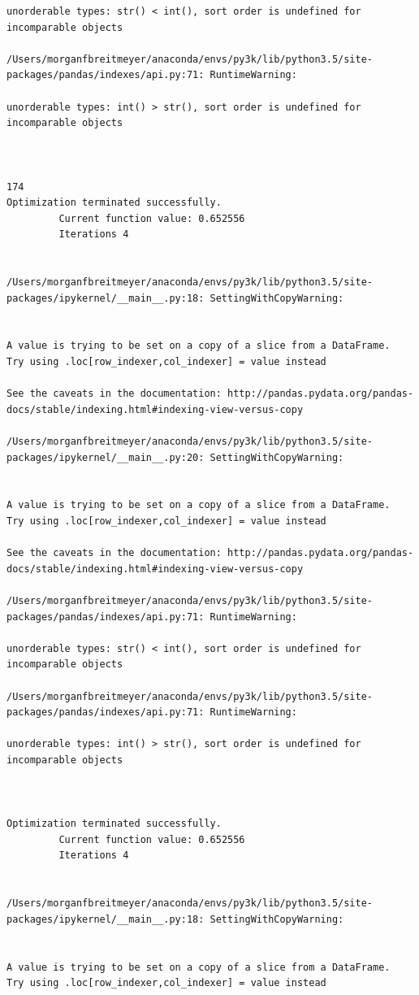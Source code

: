 \begin{lstlisting}
unorderable types: str() < int(), sort order is undefined for incomparable objects

/Users/morganfbreitmeyer/anaconda/envs/py3k/lib/python3.5/site-packages/pandas/indexes/api.py:71: RuntimeWarning:

unorderable types: int() > str(), sort order is undefined for incomparable objects



174
Optimization terminated successfully.
         Current function value: 0.652556
         Iterations 4


/Users/morganfbreitmeyer/anaconda/envs/py3k/lib/python3.5/site-packages/ipykernel/__main__.py:18: SettingWithCopyWarning:


A value is trying to be set on a copy of a slice from a DataFrame.
Try using .loc[row_indexer,col_indexer] = value instead

See the caveats in the documentation: http://pandas.pydata.org/pandas-docs/stable/indexing.html#indexing-view-versus-copy

/Users/morganfbreitmeyer/anaconda/envs/py3k/lib/python3.5/site-packages/ipykernel/__main__.py:20: SettingWithCopyWarning:


A value is trying to be set on a copy of a slice from a DataFrame.
Try using .loc[row_indexer,col_indexer] = value instead

See the caveats in the documentation: http://pandas.pydata.org/pandas-docs/stable/indexing.html#indexing-view-versus-copy

/Users/morganfbreitmeyer/anaconda/envs/py3k/lib/python3.5/site-packages/pandas/indexes/api.py:71: RuntimeWarning:

unorderable types: str() < int(), sort order is undefined for incomparable objects

/Users/morganfbreitmeyer/anaconda/envs/py3k/lib/python3.5/site-packages/pandas/indexes/api.py:71: RuntimeWarning:

unorderable types: int() > str(), sort order is undefined for incomparable objects



Optimization terminated successfully.
         Current function value: 0.652556
         Iterations 4


/Users/morganfbreitmeyer/anaconda/envs/py3k/lib/python3.5/site-packages/ipykernel/__main__.py:18: SettingWithCopyWarning:


A value is trying to be set on a copy of a slice from a DataFrame.
Try using .loc[row_indexer,col_indexer] = value instead


\end{lstlisting}
